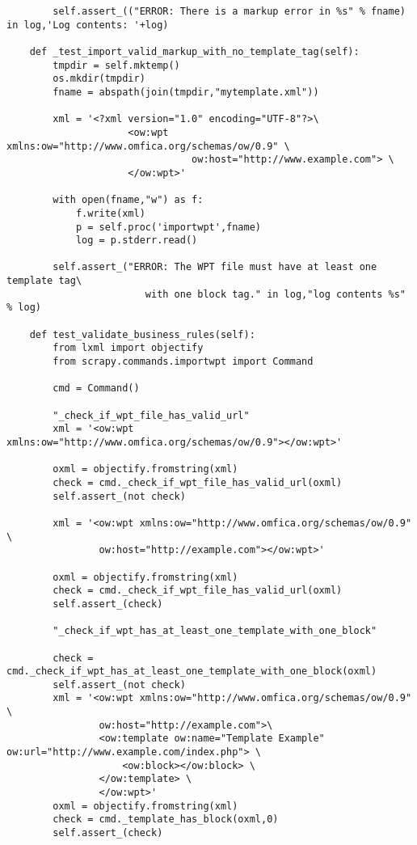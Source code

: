 \begin{lstlisting}
        self.assert_(("ERROR: There is a markup error in %s" % fname) in log,'Log contents: '+log)

    def _test_import_valid_markup_with_no_template_tag(self):
        tmpdir = self.mktemp()
        os.mkdir(tmpdir)
        fname = abspath(join(tmpdir,"mytemplate.xml"))
        
        xml = '<?xml version="1.0" encoding="UTF-8"?>\
                     <ow:wpt xmlns:ow="http://www.omfica.org/schemas/ow/0.9" \
                                ow:host="http://www.example.com"> \
                     </ow:wpt>'
        
        with open(fname,"w") as f:
            f.write(xml)
            p = self.proc('importwpt',fname)
            log = p.stderr.read()

        self.assert_("ERROR: The WPT file must have at least one template tag\
                        with one block tag." in log,"log contents %s" % log)

    def test_validate_business_rules(self):
        from lxml import objectify
        from scrapy.commands.importwpt import Command

        cmd = Command()
        
        "_check_if_wpt_file_has_valid_url"
        xml = '<ow:wpt xmlns:ow="http://www.omfica.org/schemas/ow/0.9"></ow:wpt>'
        
        oxml = objectify.fromstring(xml)
        check = cmd._check_if_wpt_file_has_valid_url(oxml)
        self.assert_(not check)
 
        xml = '<ow:wpt xmlns:ow="http://www.omfica.org/schemas/ow/0.9" \
                ow:host="http://example.com"></ow:wpt>'

        oxml = objectify.fromstring(xml)
        check = cmd._check_if_wpt_file_has_valid_url(oxml)
        self.assert_(check)

        "_check_if_wpt_has_at_least_one_template_with_one_block"
        
        check = cmd._check_if_wpt_has_at_least_one_template_with_one_block(oxml)
        self.assert_(not check)
        xml = '<ow:wpt xmlns:ow="http://www.omfica.org/schemas/ow/0.9" \
                ow:host="http://example.com">\
                <ow:template ow:name="Template Example" ow:url="http://www.example.com/index.php"> \
                    <ow:block></ow:block> \
                </ow:template> \
                </ow:wpt>'
        oxml = objectify.fromstring(xml)
        check = cmd._template_has_block(oxml,0) 
        self.assert_(check)


\end{lstlisting}
